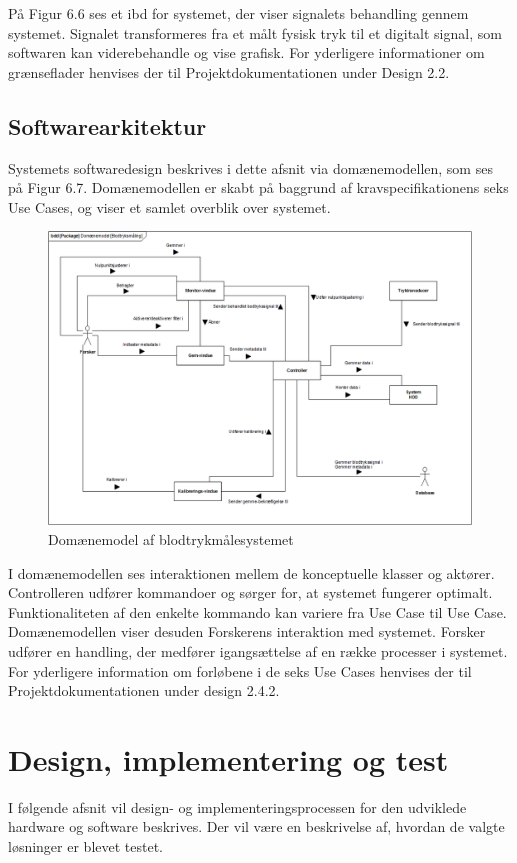 På Figur 6.6 ses et ibd for systemet, der viser signalets behandling gennem systemet. Signalet transformeres fra et målt fysisk tryk til et digitalt signal, som softwaren kan viderebehandle og vise grafisk. For yderligere informationer om grænseflader henvises der til Projektdokumentationen under Design 2.2.

 
\subsection{Softwarearkitektur}
Systemets softwaredesign beskrives i dette afsnit via domænemodellen, som ses på Figur 6.7. Domænemodellen er skabt på baggrund af kravspecifikationens seks Use Cases, og viser et samlet overblik over systemet. 
\begin{figure}[H]
	\centering
	\includegraphics[width=1\textwidth]{Figurer/dm}
	\caption{Domænemodel af blodtrykmålesystemet}
\end{figure}
I domænemodellen ses interaktionen mellem de konceptuelle klasser og aktører. Controlleren udfører kommandoer og sørger for, at systemet fungerer optimalt. Funktionaliteten af den enkelte kommando kan variere fra Use Case til Use Case. Domænemodellen viser desuden Forskerens interaktion med systemet. Forsker udfører en handling, der medfører igangsættelse af en række processer i systemet. 
For yderligere information om forløbene i de seks Use Cases henvises der til Projektdokumentationen under design 2.4.2. 


\section{Design, implementering og test}
I følgende afsnit vil design- og implementeringsprocessen for den udviklede hardware og software beskrives. Der vil være en beskrivelse af, hvordan de valgte løsninger er blevet testet. 

